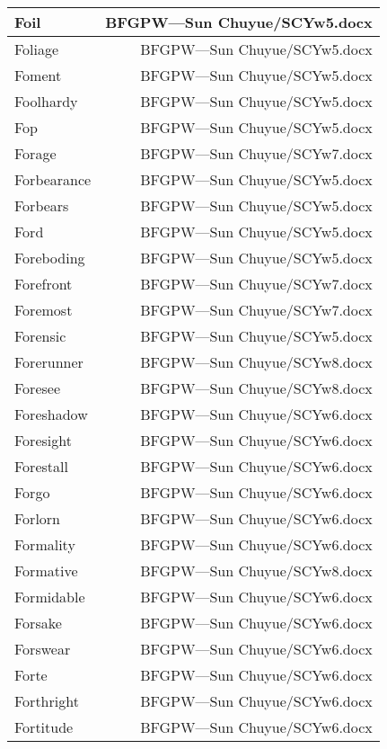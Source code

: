 \documentclass{article}
\begin{document}
\begin{center}
\begin{longtable}{|l|r|}
\hline
Foil  &  BFGPW---Sun Chuyue/SCYw5.docx\\  
\hline
Foliage  &  BFGPW---Sun Chuyue/SCYw5.docx\\  
\hline
Foment  &  BFGPW---Sun Chuyue/SCYw5.docx\\  
\hline
Foolhardy  &  BFGPW---Sun Chuyue/SCYw5.docx\\  
\hline
Fop  &  BFGPW---Sun Chuyue/SCYw5.docx\\  
\hline
Forage  &  BFGPW---Sun Chuyue/SCYw7.docx\\  
\hline
Forbearance  &  BFGPW---Sun Chuyue/SCYw5.docx\\  
\hline
Forbears  &  BFGPW---Sun Chuyue/SCYw5.docx\\  
\hline
Ford  &  BFGPW---Sun Chuyue/SCYw5.docx\\  
\hline
Foreboding  &  BFGPW---Sun Chuyue/SCYw5.docx\\  
\hline
Forefront  &  BFGPW---Sun Chuyue/SCYw7.docx\\  
\hline
Foremost  &  BFGPW---Sun Chuyue/SCYw7.docx\\  
\hline
Forensic  &  BFGPW---Sun Chuyue/SCYw5.docx\\  
\hline
Forerunner  &  BFGPW---Sun Chuyue/SCYw8.docx\\  
\hline
Foresee  &  BFGPW---Sun Chuyue/SCYw8.docx\\  
\hline
Foreshadow  &  BFGPW---Sun Chuyue/SCYw6.docx\\  
\hline
Foresight  &  BFGPW---Sun Chuyue/SCYw6.docx\\  
\hline
Forestall  &  BFGPW---Sun Chuyue/SCYw6.docx\\  
\hline
Forgo  &  BFGPW---Sun Chuyue/SCYw6.docx\\  
\hline
Forlorn  &  BFGPW---Sun Chuyue/SCYw6.docx\\  
\hline
Formality  &  BFGPW---Sun Chuyue/SCYw6.docx\\  
\hline
Formative  &  BFGPW---Sun Chuyue/SCYw8.docx\\  
\hline
Formidable  &  BFGPW---Sun Chuyue/SCYw6.docx\\  
\hline
Forsake  &  BFGPW---Sun Chuyue/SCYw6.docx\\  
\hline
Forswear  &  BFGPW---Sun Chuyue/SCYw6.docx\\  
\hline
Forte  &  BFGPW---Sun Chuyue/SCYw6.docx\\  
\hline
Forthright  &  BFGPW---Sun Chuyue/SCYw6.docx\\  
\hline
Fortitude  &  BFGPW---Sun Chuyue/SCYw6.docx\\  

\end{longtable}
\end{center}
\end{document}
